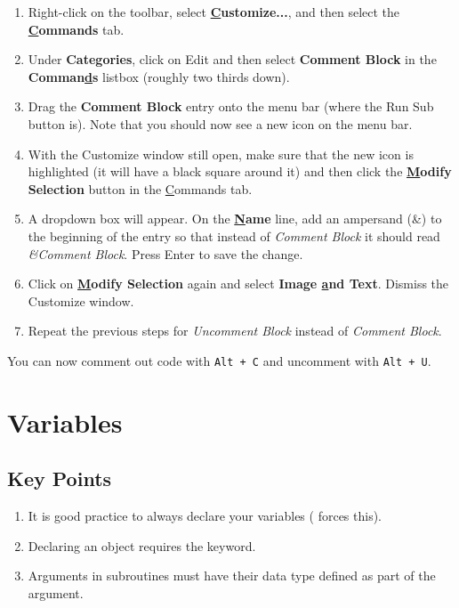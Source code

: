\documentclass[11pt]{article}%
\begin{document}
\begin{enumerate}
    \item Right-click on the toolbar, select \textbf{\underline{C}ustomize...}, and then select the \textbf{\underline{C}ommands} tab.
    \item Under \textbf{Cate\underline{g}ories}, click on Edit and then select \textbf{Comment Block} in the \textbf{Comman\underline{d}s} listbox (roughly two thirds down).
    \item Drag the \textbf{Comment Block} entry onto the menu bar (where the Run Sub button is). Note that you should now see a new icon on the menu bar.
    \item With the Customize window still open, make sure that the new icon is highlighted (it will have a black square around it) and then click the \textbf{\underline{M}odify Selection} button in the \underline{C}ommands tab.
    \item A dropdown box will appear. On the \textbf{\underline{N}ame} line, add an ampersand (\&) to the beginning of the entry so that instead of \textit{Comment Block} it should read \textit{\&Comment Block}. Press Enter to save the change.
    \item Click on \textbf{\underline{M}odify Selection} again and select \textbf{Image \underline{a}nd Text}. Dismiss the Customize window.
    \item Repeat the previous steps for \textit{Uncomment Block} instead of \textit{Comment Block}.
\end{enumerate}

You can now comment out code with \texttt{Alt + C} and uncomment with \texttt{Alt + U}.


\section{Variables}


\subsection{Key Points}

\begin{enumerate}
    \item It is good practice to always declare your variables ( forces this).
    \item Declaring an object requires the  keyword.
    \item Arguments in subroutines must have their data type defined as part of the argument.
\end{enumerate}
\end{document}
